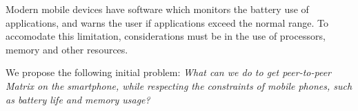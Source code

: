 \noindent
Modern mobile devices have software which monitors the battery use of applications, and warns the user if applications exceed the normal range.
To accomodate this limitation, considerations must be in the use of processors, memory and other resources.

\begin{center}
    We propose the following initial problem: \textit{What can we do to get peer-to-peer Matrix on the smartphone, while respecting the constraints of mobile phones, such as battery life and memory usage?}
\end{center}

